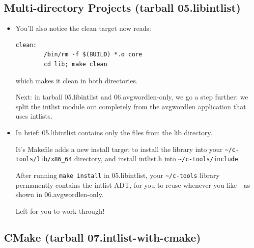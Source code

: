 \documentclass[aspectratio=169]{beamer}
\begin{document}
\subsection{Multi-directory Projects (tarball 05.libintlist)}

\begin{frame}[fragile]
\begin{itemize}
\item
You'll also notice the \alert{clean} target now reads:
\begin{verbatim}
clean:
        /bin/rm -f $(BUILD) *.o core
        cd lib; make clean
\end{verbatim}
which makes it clean in both directories.

\pitem
Next: in tarball \alert{05.libintlist} and \alert{06.avgwordlen-only},
we go a step further:
we split the intlist module out completely from the
avgwordlen application that uses intlists.

\item
In brief: \alert{05.libintlist} contains only the files from
the \alert{lib} directory.

\pitem
It's Makefile adds a new \alert{install} target to install the library into
your \verb+~/c-tools/lib/x86_64+ directory,
and install intlist.h into \verb+~/c-tools/include+.

\pitem
After running \verb+make install+ in \alert{05.libintlist}, your
\verb+~/c-tools+ library permanently contains the intlist ADT, for you to
reuse whenever you like - as shown in \alert{06.avgwordlen-only}.

\pitem
Left for you to work through!

\end{itemize}
\end{frame}

\subsection{CMake (tarball 07.intlist-with-cmake)}
\end{document}
